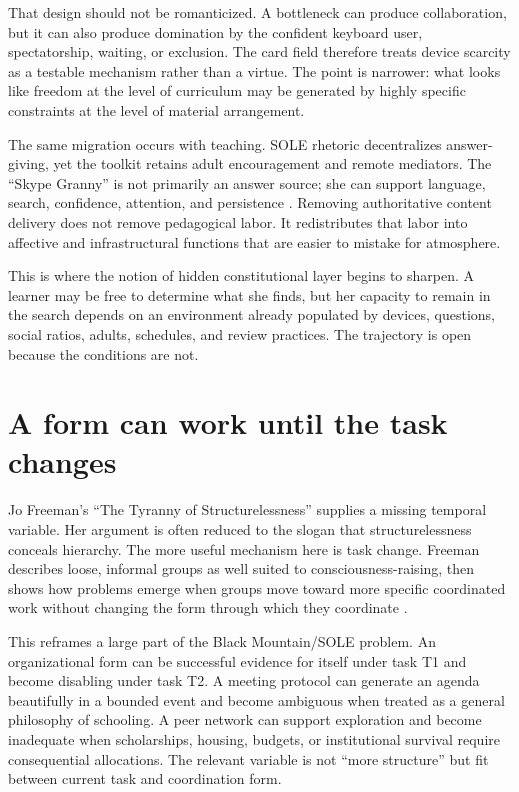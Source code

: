 \documentclass[11pt]{article}
\begin{document}
That design should not be romanticized. A bottleneck can produce collaboration, but it can also produce domination by the confident keyboard user, spectatorship, waiting, or exclusion. The card field therefore treats device scarcity as a testable mechanism rather than a virtue. The point is narrower: what looks like freedom at the level of curriculum may be generated by highly specific constraints at the level of material arrangement.

The same migration occurs with teaching. SOLE rhetoric decentralizes answer-giving, yet the toolkit retains adult encouragement and remote mediators. The ``Skype Granny'' is not primarily an answer source; she can support language, search, confidence, attention, and persistence \cite{mitra_sole_toolkit}. Removing authoritative content delivery does not remove pedagogical labor. It redistributes that labor into affective and infrastructural functions that are easier to mistake for atmosphere.

This is where the notion of hidden constitutional layer begins to sharpen. A learner may be free to determine what she finds, but her capacity to remain in the search depends on an environment already populated by devices, questions, social ratios, adults, schedules, and review practices. The trajectory is open because the conditions are not.

\section{A form can work until the task changes}
Jo Freeman's ``The Tyranny of Structurelessness'' supplies a missing temporal variable. Her argument is often reduced to the slogan that structurelessness conceals hierarchy. The more useful mechanism here is task change. Freeman describes loose, informal groups as well suited to consciousness-raising, then shows how problems emerge when groups move toward more specific coordinated work without changing the form through which they coordinate \cite{freeman1972tyranny}.

This reframes a large part of the Black Mountain/SOLE problem. An organizational form can be successful evidence for itself under task T1 and become disabling under task T2. A meeting protocol can generate an agenda beautifully in a bounded event and become ambiguous when treated as a general philosophy of schooling. A peer network can support exploration and become inadequate when scholarships, housing, budgets, or institutional survival require consequential allocations. The relevant variable is not ``more structure'' but fit between current task and coordination form.
\end{document}
